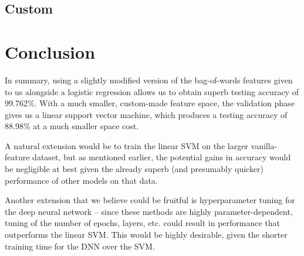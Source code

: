 \documentclass{article} %
\begin{document}
\subsection{Custom}
\section{Conclusion}
In summary, using a slightly modified version of the bag-of-words features given to us alongside a logistic regression allows us to obtain superb testing accuracy of 99.762\%.  With a much smaller, custom-made feature space, the validation phase gives us a linear support vector machine, which produces a testing accuracy of 88.98\% at a much smaller space cost.\par 
A natural extension would be to train the linear SVM on the larger vanilla-feature dataset, but as mentioned earlier, the potential gains in accuracy would be negligible at best given the already superb (and presumably quicker) performance of other models on that data.\par 
Another extension that we believe could be fruitful is hyperparameter tuning for the deep neural network -- since these methods are highly parameter-dependent, tuning of the number of epochs, layers, etc. could result in performance that outperforms the linear SVM.  This would be highly desirable, given the shorter training time for the DNN over the SVM.
\end{document}
